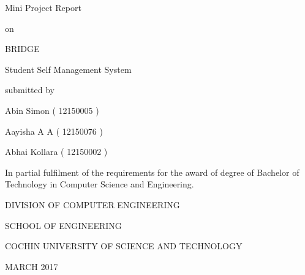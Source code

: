 \vspace*{\fill}

\begin{center}
\LARGE
Mini Project Report

\hspace{1em}

on

\hspace{1em}

\huge
BRIDGE

\hspace{1em}
\Large
Student Self Management System

\hspace{1em}

submitted by

\hspace{1em}

\Large
Abin Simon ( 12150005 )

\Large
Aayisha A A ( 12150076 )

\Large
Abhai Kollara ( 12150002 )

\large
In partial fulfilment of the requirements for the award of degree of Bachelor of Technology in Computer Science and Engineering.

\hspace{1em}

\LARGE
DIVISION OF COMPUTER ENGINEERING

SCHOOL OF ENGINEERING

COCHIN UNIVERSITY OF SCIENCE AND TECHNOLOGY

\hspace{1em}

\large
MARCH 2017
\end{center}

\vspace*{\fill}
